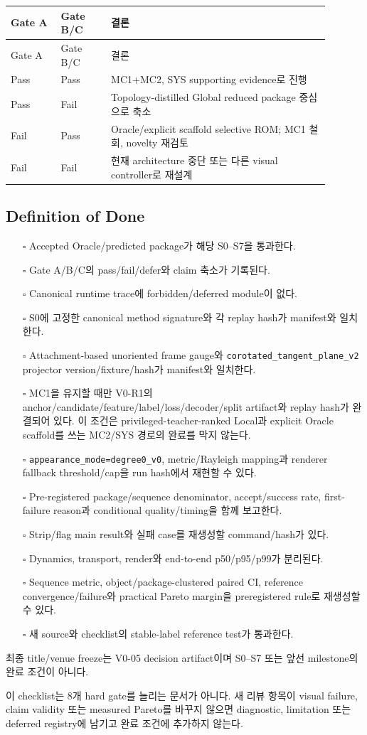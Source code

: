 \documentclass[10pt]{article}
\newcommand{\code}[1]{{\small\nolinkurl{#1}}}
\begin{document}
\begin{longtable}{L{0.14\linewidth}L{0.14\linewidth}L{0.61\linewidth}}
\toprule
Gate A & Gate B/C & 결론\\
\midrule
\endfirsthead
\toprule
Gate A & Gate B/C & 결론\\
\midrule
\endhead
Pass & Pass & MC1+MC2, SYS supporting evidence로 진행\\
Pass & Fail & Topology-distilled Global reduced package 중심으로 축소\\
Fail & Pass & Oracle/explicit scaffold selective ROM; MC1 철회, novelty 재검토\\
Fail & Fail & 현재 architecture 중단 또는 다른 visual controller로 재설계\\
\bottomrule
\end{longtable}

\subsection{Definition of Done}

\begin{itemize}
  \item [\(\square\)] Accepted Oracle/predicted package가 해당 S0--S7을 통과한다.
  \item [\(\square\)] Gate A/B/C의 pass/fail/defer와 claim 축소가 기록된다.
  \item [\(\square\)] Canonical runtime trace에 forbidden/deferred module이 없다.
  \item [\(\square\)] S0에 고정한 canonical method signature와 각 replay hash가
  manifest와 일치한다.
  \item [\(\square\)] Attachment-based unoriented frame gauge와
  \code{corotated\_tangent\_plane\_v2} projector version/fixture/hash가 manifest와 일치한다.
  \item [\(\square\)] MC1을 유지할 때만 V0-R1의 anchor/candidate/feature/label/loss/decoder/split
  artifact와 replay hash가 완결되어 있다. 이 조건은 privileged-teacher-ranked Local과
  explicit Oracle scaffold를 쓰는 MC2/SYS 경로의 완료를 막지 않는다.
  \item [\(\square\)] \code{appearance\_mode=degree0\_v0}, metric/Rayleigh mapping과
  renderer fallback threshold/cap을 run hash에서 재현할 수 있다.
  \item [\(\square\)] Pre-registered package/sequence denominator, accept/success rate,
  first-failure reason과 conditional quality/timing을 함께 보고한다.
  \item [\(\square\)] Strip/flag main result와 실패 case를 재생성할 command/hash가 있다.
  \item [\(\square\)] Dynamics, transport, render와 end-to-end p50/p95/p99가 분리된다.
  \item [\(\square\)] Sequence metric, object/package-clustered paired CI, reference convergence/failure와
  practical Pareto margin을 preregistered rule로 재생성할 수 있다.
  \item [\(\square\)] 새 source와 checklist의 stable-label reference test가 통과한다.
\end{itemize}

최종 title/venue freeze는 V0-05 decision artifact이며 S0--S7 또는 앞선 milestone의 완료 조건이 아니다.

이 checklist는 8개 hard gate를 늘리는 문서가 아니다.
새 리뷰 항목이 visual failure, claim validity 또는 measured Pareto를 바꾸지 않으면
diagnostic, limitation 또는 deferred registry에 남기고 완료 조건에 추가하지 않는다.
\end{document}

